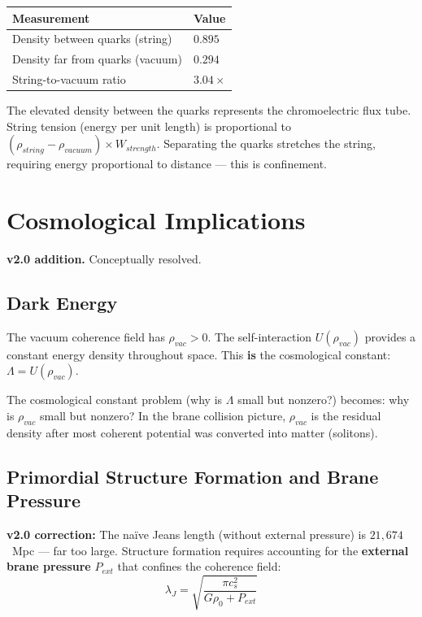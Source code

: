 \documentclass[11pt, a4paper]{article}
\begin{document}
\begin{center}
\begin{tabular}{@{}ll@{}}
\toprule
\textbf{Measurement} & \textbf{Value} \\
\midrule
Density between quarks (string) & $0.895$ \\
Density far from quarks (vacuum) & $0.294$ \\
String-to-vacuum ratio & $3.04\times$ \\
\bottomrule
\end{tabular}
\end{center}

The elevated density between the quarks represents the chromoelectric
flux tube. String tension (energy per unit length) is proportional to
$(\rho_{string} - \rho_{vacuum}) \times W_{strength}$. Separating the
quarks stretches the string, requiring energy proportional to distance
--- this is confinement.

\section{Cosmological Implications}
\label{sec:cosmology}

\textbf{v2.0 addition.} Conceptually resolved.

\subsection{Dark Energy}

The vacuum coherence field has $\rho_{vac} > 0$. The self-interaction
$U(\rho_{vac})$ provides a constant energy density throughout space.
This \textbf{is} the cosmological constant:
$\Lambda = U(\rho_{vac})$.

The cosmological constant problem (why is $\Lambda$ small but nonzero?)
becomes: why is $\rho_{vac}$ small but nonzero? In the brane collision
picture, $\rho_{vac}$ is the residual density after most coherent
potential was converted into matter (solitons).

\subsection{Primordial Structure Formation and Brane Pressure}

\textbf{v2.0 correction:} The na\"ive Jeans length (without external
pressure) is $21{,}674$~Mpc --- far too large. Structure formation
requires accounting for the \textbf{external brane pressure} $P_{ext}$
that confines the coherence field:
\begin{equation}
  \lambda_J = \sqrt{\frac{\pi c_s^2}{G\rho_0 + P_{ext}}}
\end{equation}
\end{document}
